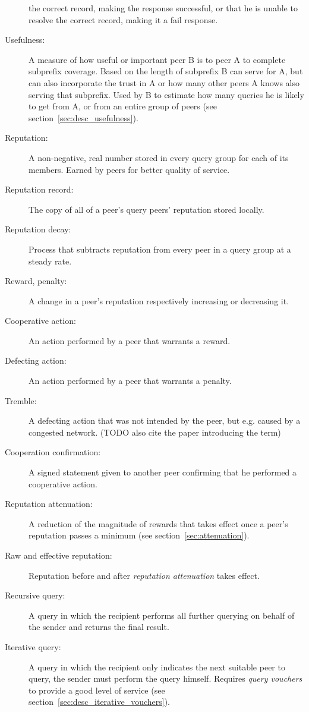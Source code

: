 \begin{description}
the correct record, making the response successful, or that he is unable to
resolve the correct record, making it a fail response.
\item[Usefulness:] A measure of how useful or important peer B is to peer A to
complete subprefix coverage. Based on the length of subprefix B can serve for A,
but can also incorporate the trust in A or how many other peers A knows also
serving that subprefix. Used by B to estimate how many queries he is likely to
get from A, or from an entire group of peers (see
section~\ref{sec:desc_usefulness}).
\item[Reputation:] A non-negative, real number stored in every query group for
each of its members. Earned by peers for better quality of service.
\item[Reputation record:] The copy of all of a peer's query peers' reputation
stored locally.
\item[Reputation decay:] Process that subtracts reputation from every peer in a
query group at a steady rate.
\item[Reward, penalty:] A change in a peer's reputation respectively increasing
or decreasing it.
\item[Cooperative action:] An action performed by a peer that warrants a reward.
\item[Defecting action:] An action performed by a peer that warrants a penalty.
\item[Tremble:] A defecting action that was not intended by the peer, but e.g.
caused by a congested network. (TODO also cite the paper introducing the term)
\item[Cooperation confirmation:] A signed statement given to another peer
confirming that he performed a cooperative action.
\item[Reputation attenuation:] A reduction of the magnitude of rewards that
takes effect once a peer's reputation passes a minimum (see
section~\ref{sec:attenuation}).
\item[Raw and effective reputation:] Reputation before and after
\emph{reputation attenuation} takes effect.
\item[Recursive query:] A query in which the recipient performs all further
querying on behalf of the sender and returns the final result.
\item[Iterative query:] A query in which the recipient only indicates the next
suitable peer to query, the sender must perform the query himself. Requires
\emph{query vouchers} to provide a good level of service (see
section~\ref{sec:desc_iterative_vouchers}).

\end{description}
